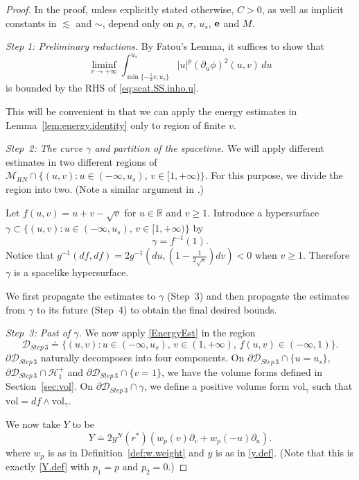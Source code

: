 \documentclass[10pt, reqno]{amsart}
\theoremstyle{definition}
\theoremstyle{remark}
\numberwithin{equation}{section}
\def\ls{\lesssim}
\newcommand{\rd}{\partial}
\newcommand{\0}{\emptyset}
\newcommand{\gmm}{\gamma}
\newcommand{\calH}{\mathcal H}
\newcommand{\f}{\frac}
\newcommand{\EH}{\calH^{+}}
\newcommand{\pfstep}[1]{\vspace{.5em} {\it #1.}}
\newcommand{\vol}{\mathrm{vol}}
\begin{document}
\begin{proof}
In the proof, unless explicitly stated otherwise, $C>0$, as well as implicit constants in $\ls$ and $\sim$, depend only on $p$, $\sigma$, $u_s$, ${\bf e}$ and $M$.

\pfstep{Step 1: Preliminary reductions} By Fatou's Lemma, it suffices to show that 
\begin{equation}\label{eq:reduction.by.Fatou}
\liminf_{v\to+\infty}\int_{\min\{-\f 12 v,u_s\}}^{u_s} |u|^p (\rd_u\phi)^2(u,v)\, du
\end{equation}
is bounded by the RHS of \eqref{eq:scat.SS.inho.u}.

This will be convenient in that we can apply the energy estimates in Lemma~\ref{lem:energy.identity} only to region of finite $v$.

\pfstep{Step~2: The curve $\gamma$ and partition of the spacetime} We will apply different estimates in two different regions of $\mathcal M_{RN} \cap \{(u,v): u\in (-\infty,u_s),\,v\in [1,+\infty)\}$. For this purpose, we divide the region into two. (Note a similar argument in \cite{D2,LS,DL}.)

Let $f(u,v)=u+v-\sqrt{v}$ for $u\in \mathbb R$ and $v\geq 1$. Introduce a hypersurface $\gamma\subset \{(u,v): u\in (-\infty,u_s),\,v\in [1,+\infty)\}$ by 
$$\gamma=f^{-1}(1).$$ 
Notice that $g^{-1}(df,df)=2 g^{-1}(du, (1-\f{1}{2\sqrt{v}})dv)<0$ when $v\geq 1$. Therefore $\gmm$ is a spacelike hypersurface.

We first propagate the estimates to $\gamma$ (Step~3) and then propagate the estimates from $\gamma$ to its future (Step~4) to obtain the final desired bounds.

\pfstep{Step~3: Past of $\gamma$} We now apply \eqref{EnergyEst} in the region 
$$\mathcal D_{Step\,3}  \doteq  \{(u,v): u\in (-\infty,u_s),\, v\in (1,+\infty),\, f(u,v) \in (-\infty,1) \}.$$
$\rd \mathcal D_{Step\,3}$ naturally decomposes into four components. On $\rd\mathcal D_{Step\,3}\cap \{u=u_s\}$, $\rd\mathcal D_{Step\,3}\cap \EH_1$ and $\rd\mathcal D_{Step\,3}\cap \{v=1\}$, we have the volume forms defined in Section~\ref{sec:vol}. On $\rd\mathcal D_{Step\,3}\cap\gamma$, we define a positive volume form $\vol_{\gamma}$ such that $\vol=df\wedge \vol_{\gamma}$.

We now take $Y$ to be
\begin{equation}\label{Y.in.step.3}
Y \doteq 2 y^N(r^*) \left(w_{p}(v)\rd_v+ w_{p}(-u)\rd_u\right).
\end{equation}
where $w_p$ is as in Definition~\ref{def:w.weight}
and $y$ is as in \eqref{y.def}. (Note that this is exactly \eqref{Y.def} with $p_1 = p$ and $p_2 = 0$.)


\end{proof}
\end{document}
